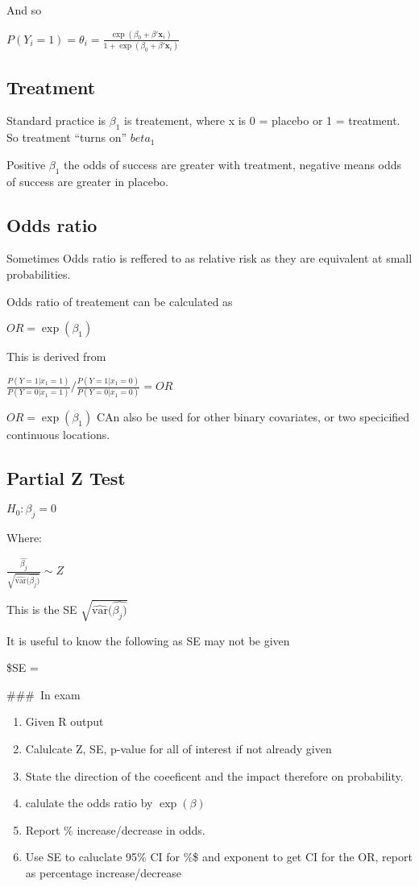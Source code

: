 \documentclass[
  letterpaper,
  DIV=11,
  numbers=noendperiod]{scrreprt}
\providecommand{\tightlist}{%
  \setlength{\itemsep}{0pt}\setlength{\parskip}{0pt}}\usepackage{longtable,booktabs,array}
\begin{document}
And so

\(P(Y_i = 1)= \theta_i = \frac{\exp(\beta_0 + \beta'\mathbf{x}_i)}{1+\exp(\beta_0 + \beta'\mathbf{x}_i)}\)

\hypertarget{treatment}{%
\subsection{Treatment}\label{treatment}}

Standard practice is \(\beta_1\) is treatement, where x is 0 = placebo
or 1 = treatment. So treatment ``turns on'' \(beta_1\)

Positive \(\beta_1\) the odds of success are greater with treatment,
negative means odds of success are greater in placebo.

\hypertarget{odds-ratio}{%
\subsection{Odds ratio}\label{odds-ratio}}

Sometimes Odds ratio is reffered to as relative risk as they are
equivalent at small probabilities.

Odds ratio of treatement can be calculated as

\(OR = \exp(\beta_1)\)

This is derived from

\(\frac{P(Y=1|x_1 = 1)}{P(Y=0|x_1 = 1)}/ \frac{P(Y=1|x_1 = 0)}{P(Y=0|x_1 = 0)} = OR\)

\(OR = \exp(\beta_1)\) CAn also be used for other binary covariates, or
two specicified continuous locations.

\hypertarget{partial-z-test}{%
\subsection{Partial Z Test}\label{partial-z-test}}

\(H_0 : \beta_j = 0\)

Where:

\(\frac{\hat{\beta_j}}{  \sqrt{  \hat{\text{var}}(\hat{\beta_j)}  } } \sim Z\)

This is the SE \(\sqrt{\hat{\text{var}}(\hat{\beta_j)}}\)

It is useful to know the following as SE may not be given

\$SE = 

\#\#\#~In exam

\begin{enumerate}
\def\labelenumi{\arabic{enumi})}
\tightlist
\item
  Given R output
\item
  Calulcate Z, SE, p-value for all of interest if not already given
\item
  State the direction of the coeeficent and the impact therefore on
  probability.
\item
  calulate the odds ratio by \(\exp(\beta)\)
\item
  Report \% increase/decrease in odds.
\item
  Use SE to caluclate 95\% CI for \%\beta\$ and exponent to get CI for
  the OR, report as percentage increase/decrease
\end{enumerate}
\end{document}
